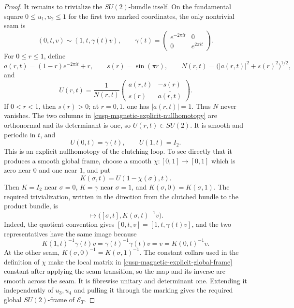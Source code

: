 \begin{proof}
It remains to trivialize the \(SU(2)\)-bundle itself.  On the fundamental
square \(0\le u_1,u_2\le1\) for the first two marked coordinates, the only
nontrivial seam is
\[
 (0,t,v)\sim(1,t,\gamma(t)v),
 \qquad
 \gamma(t)=
 \begin{pmatrix}e^{-2\pi it}&0\\0&e^{2\pi it}\end{pmatrix}.
\]
For \(0\le r\le1\), define
\[
 a(r,t)=(1-r)e^{-2\pi it}+r,
 \qquad
 s(r)=\sin(\pi r),
 \qquad
 N(r,t)=\bigl(|a(r,t)|^2+s(r)^2\bigr)^{1/2},
\]
and
\begin{equation}
 U(r,t)=\frac1{N(r,t)}
 \begin{pmatrix}
  a(r,t)&-s(r)\\
  s(r)&\overline{a(r,t)}
 \end{pmatrix}.
 \label{cusp-magnetic-explicit-nullhomotopy}
\end{equation}
If \(0<r<1\), then \(s(r)>0\); at \(r=0,1\), one has
\(|a(r,t)|=1\).  Thus \(N\) never vanishes.  The two columns in
\eqref{cusp-magnetic-explicit-nullhomotopy} are orthonormal and its
determinant is one, so \(U(r,t)\in SU(2)\).  It is smooth and periodic in
\(t\), and
\[
 U(0,t)=\gamma(t),
 \qquad
 U(1,t)=I_2.
\]
This is an explicit nullhomotopy of the clutching loop.  To see directly
that it produces a smooth global frame, choose a smooth
\(\chi:[0,1]\to[0,1]\) which is zero near \(0\) and one near \(1\), and put
\[
 K(\sigma,t)=U(1-\chi(\sigma),t).
\]
Then \(K=I_2\) near \(\sigma=0\), \(K=\gamma\) near \(\sigma=1\), and
\(K(\sigma,0)=K(\sigma,1)\).  The required trivialization, written in the
direction from the clutched bundle to the product bundle, is
\begin{equation}
 [\sigma,t,v]\longmapsto
 \bigl([\sigma,t],K(\sigma,t)^{-1}v\bigr).
 \label{cusp-magnetic-explicit-global-frame}
\end{equation}
Indeed, the quotient convention gives
\([0,t,v]=[1,t,\gamma(t)v]\), and the two representatives have the same
image because
\[
 K(1,t)^{-1}\gamma(t)v
 =\gamma(t)^{-1}\gamma(t)v
 =v=K(0,t)^{-1}v.
\]
At the other seam,
\(K(\sigma,0)^{-1}=K(\sigma,1)^{-1}\).  The constant collars used in the
definition of \(\chi\) make the local matrix in
\cref{cusp-magnetic-explicit-global-frame} constant after applying the
seam transition, so the map and its inverse are smooth across the seam.
It is fibrewise unitary and determinant one.  Extending it independently
of \(u_3,u_4\) and
pulling it through the marking gives the required global
\(SU(2)\)-frame of \(\mathscr E_T\).
\end{proof}


